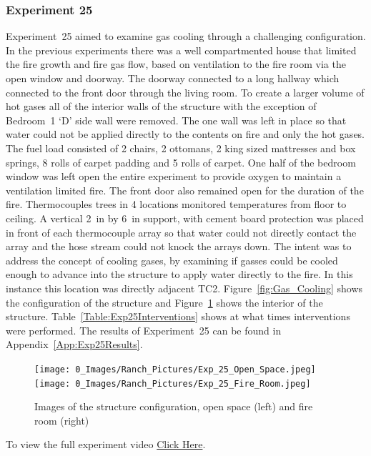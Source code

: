 \documentclass[12pt,oneside]{book}
\begin{document}
\subsubsection{Experiment 25}
Experiment~25 aimed to examine gas cooling through a challenging configuration. In the previous experiments there was a well compartmented house that limited the fire growth and fire gas flow, based on ventilation to the fire room via the open window and doorway.  The doorway connected to a long hallway which connected to the front door through the living room.  To create a larger volume of hot gases all of the interior walls of the structure with the exception of Bedroom~1 `D' side wall were removed.  The one wall was left in place so that water could not be applied directly to the contents on fire and only the hot gases.  The fuel load consisted of 2 chairs, 2 ottomans, 2 king sized mattresses and box springs, 8 rolls of carpet padding and 5 rolls of carpet.  One half of the bedroom window was left open the entire experiment to provide oxygen to maintain a ventilation limited fire.  The front door also remained open for the duration of the fire.  Thermocouples trees in 4 locations monitored temperatures from floor to ceiling.  A vertical 2~in by 6~in support, with cement board protection was placed in front of each thermocouple array so that water could not directly contact the array and the hose stream could not knock the arrays down.  The intent was to address the concept of cooling gases, by examining if gasses could be cooled enough to advance into the structure to apply water directly to the fire. In this instance this location was directly adjacent TC2. Figure~\ref{fig:Gas_Cooling} shows the configuration of the structure and Figure~\ref{fig:Exp_25_Images} shows the interior of the structure. Table~\ref{Table:Exp25Interventions} shows at what times interventions were performed. The results of Experiment~25 can be found in Appendix~\ref{App:Exp25Results}. 

\begin{figure}[H]
\centering
\texttt{[image: 0\_Images/Ranch\_Pictures/Exp\_25\_Open\_Space.jpeg]}
\texttt{[image: 0\_Images/Ranch\_Pictures/Exp\_25\_Fire\_Room.jpeg]}
\caption{Images of the structure configuration, open space (left) and fire room (right)}
\label{fig:Exp_25_Images}
\end{figure}

To view the full experiment video \href{https://youtu.be/gl8rc1Nsl1k}{Click Here}.
\end{document}
